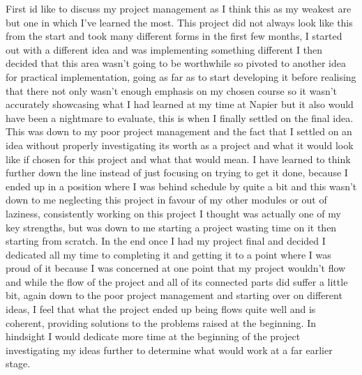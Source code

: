 \documentclass[12pt,a4paper]{article}
\begin{document}
First id like to discuss my project management as I think this as my weakest are but one in which I've learned the most. This project did not always look like this from the start and took many different forms in the first few months, I started out with a different idea and was implementing something different I then decided that this area wasn't going to be worthwhile so pivoted to another idea for practical implementation, going as far as to start developing it before realising that there not only wasn't enough emphasis on my chosen course so it wasn't accurately showcasing what I had learned at my time at Napier but it also would have been a nightmare to evaluate, this is when I finally settled on the final idea. This was down to my poor project management and the fact that I settled on an idea without properly investigating its worth as a project and what it would look like if chosen for this project and what that would mean. I have learned to think further down the line instead of just focusing on trying to get it done, because I ended up in a position where I was behind schedule by quite a bit and this wasn't down to me neglecting this project in favour of my other modules or out of laziness, consistently working on this project I thought was actually one of my key strengths, but was down to me starting a project wasting time on it then starting from scratch. In the end once I had my project final and decided I dedicated all my time to completing it and getting it to a point where I was proud of it because I was concerned at one point that my project wouldn't flow and while the flow of the project and all of its connected parts did suffer a little bit, again down to the poor project management and starting over on different ideas, I feel that what the project ended up being flows quite well and is coherent, providing solutions to the problems raised at the beginning. In hindsight I would dedicate more time at the beginning of the project investigating my ideas further to determine what would work at a far earlier stage. 
\end{document}
